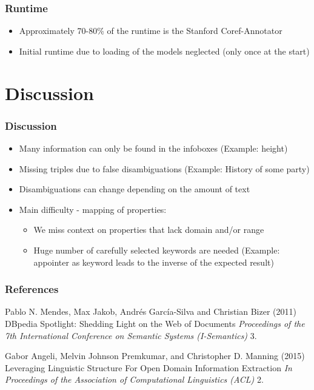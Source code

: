 \documentclass{beamer}
\begin{document}
\begin{frame}
\frametitle{Runtime}
\begin{itemize}
	\item Approximately 70-80\% of the runtime is the Stanford Coref-Annotator
	\item Initial runtime due to loading of the models neglected (only once at the start)
\end{itemize}

\end{frame}

\section{Discussion}
\begin{frame}
\frametitle{Discussion}
\begin{itemize}
	\item Many information can only be found in the infoboxes (Example: height)
	\item Missing triples due to false disambiguations (Example: History of some party)
	\item Disambiguations can change depending on the amount of text
	\item Main difficulty - mapping of properties:
	\begin{itemize}
		\item We miss context on properties that lack domain and/or range
		\item Huge number of carefully selected keywords are needed (Example: appointer as keyword leads to the inverse of the expected result)		
	\end{itemize}

\end{itemize}

\end{frame}


\begin{frame}
\frametitle{References}
\footnotesize{
	\begin{thebibliography}{99} %
		 Pablo N. Mendes, Max Jakob, Andrés García-Silva and Christian Bizer (2011)
		\newblock DBpedia Spotlight: Shedding Light on the Web of
		Documents
		\newblock \emph{
			Proceedings of the 7th International Conference on Semantic Systems (I-Semantics) } 3.
	\end{thebibliography}
	\begin{thebibliography}{99} %
		 Gabor Angeli, Melvin Johnson Premkumar, and Christopher D. Manning (2015)
		\newblock Leveraging Linguistic Structure For Open Domain Information
		Extraction
		\newblock \emph{
			In Proceedings of the Association of Computational Linguistics (ACL) } 2.
	\end{thebibliography}
}
\end{frame}
\end{document}
